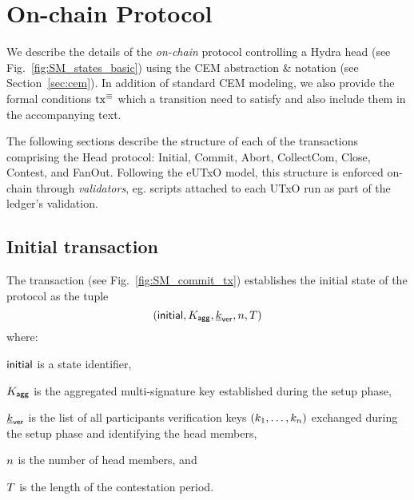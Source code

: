 \section{On-chain Protocol}\label{sec:mainchain}

We describe the details of the \emph{on-chain} protocol controlling a
Hydra head (see Fig.~\ref{fig:SM_states_basic}) using the CEM abstraction \&
notation (see Section~\ref{sec:cem}). In addition of standard CEM modeling, we
also provide the formal conditions $\mathrm{tx}^\equiv$ which a transition need to
satisfy and also include them in the accompanying text.

The following sections describe the structure of each of the transactions comprising 
the Head protocol: Initial, Commit, Abort, CollectCom, Close, Contest, and FanOut. 
Following the eUTxO model, this structure is enforced on-chain through \emph{validators}, eg. scripts attached to each UTxO run as part of the ledger's validation. 



\subsection{Initial transaction} 

The \mtxInit{} transaction (see
Fig.~\ref{fig:SM_commit_tx}) establishes the initial state of the protocol as the tuple
$$
(\mathsf{initial},K_{\mathsf{agg}},\underline{k}_{\mathsf{ver}},n,T)
$$ 
where:
\begin{menumerate}
    \item $\mathsf{initial}$ is
a state identifier, 
   \item $K_{\mathsf{agg}}$ is the aggregated multi-signature key established
during the setup phase, 
  \item $\underline{k}_{\mathsf{ver}}$ is the list of all participants verification
keys $(k_1,\ldots,k_n)$ exchanged during the setup phase and identifying the
head members, 
  \item $n$ is the number of head members, and 
  \item $T$ is the length of the contestation period.
\end{menumerate} 

